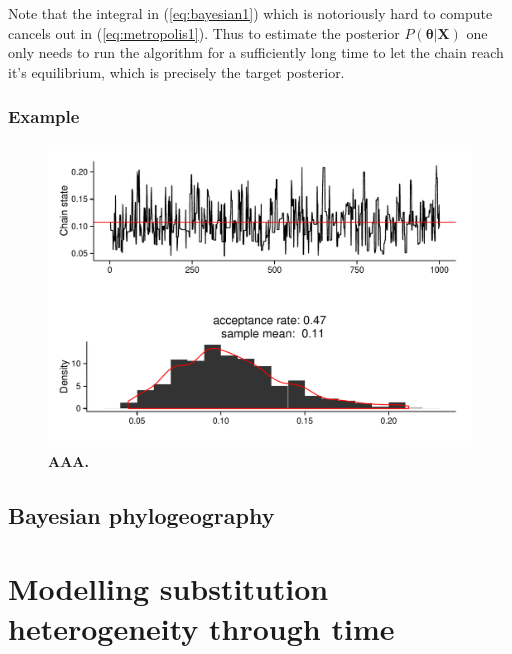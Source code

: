 \documentclass[12pt,twoside]{mitthesis}
\theoremstyle{plain}
\theoremstyle{definition}
\theoremstyle{remark}
\begin{document}
Note that the integral in (\ref{eq:bayesian1}) which is notoriously hard to compute cancels out in (\ref{eq:metropolis1}).
Thus to estimate the posterior $P\left(\mathbf{\theta}|\mathbf{X}\right)$ one only needs to run the algorithm for a sufficiently long time to let the chain reach it's equilibrium, which is precisely the target posterior.


\subsection{Example}


\begin{figure}[H]
\begin{center}
\includegraphics[scale=0.5]{metropolis} 
\end{center}
\caption{{ \footnotesize {\bf AAA.} 
}}
\label{fig:metropolis}
\end{figure}




 







\section{Bayesian phylogeography}

\chapter{Modelling substitution heterogeneity through time}
\end{document}
